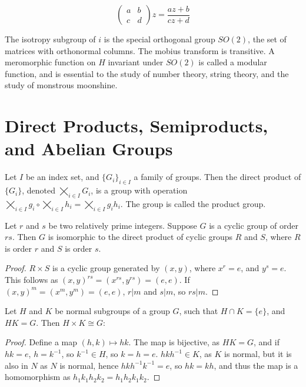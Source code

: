 \documentclass[12pt]{report}
\begin{document}
\[\begin{pmatrix} a & b \\ c & d \end{pmatrix} z = \frac{az + b}{cz + d}\]

The isotropy subgroup of $i$ is the special orthogonal group $SO(2)$, the set of matrices with orthonormal columns. The mobius transform is transitive. A meromorphic function on $H$ invariant under $SO(2)$ is called a modular function, and is essential to the study of number theory, string theory, and the study of monstrous moonshine.

\chapter{Direct Products, Semiproducts, and Abelian Groups}

Let $I$ be an index set, and $\{ G_i \}_{i \in I}$ a family of groups. Then the direct product of $\{ G_i \}$, denoted $\bigtimes_{i \in I} G_i$, is a group with operation $\bigtimes_{i \in I} g_i \circ \bigtimes_{i \in I} h_i = \bigtimes_{i \in I} g_ih_i$. The group is called the product group.

Let $r$ and $s$ be two relatively prime integers. Suppose $G$ is a cyclic group of order $rs$. Then $G$ is isomorphic to the direct product of cyclic groups $R$ and $S$, where $R$ is order $r$ and $S$ is order $s$.
\begin{proof}
    $R \times S$ is a cyclic group generated by $(x,y)$, where $x^r = e$, and $y^s = e$. This follows as $(x,y)^{rs} = (x^{rs},y^{rs}) = (e,e)$. If $(x,y)^m = (x^m,y^m) = (e,e)$, $r|m$ and $s|m$, so $rs|m$.
\end{proof}

Let $H$ and $K$ be normal subgroups of a group $G$, such that $H \cap K = \{ e \}$, and $HK = G$. Then $H \times K \cong G$:
\begin{proof}
    Define a map $(h,k) \mapsto hk$. The map is bijective, as $HK = G$, and if $hk = e$, $h = k^{-1}$, so $k^{-1} \in H$, so $k = h = e$. $hkh^{-1} \in K$, as $K$ is normal, but it is also in $N$ as $N$ is normal, hence $hkh^{-1}k^{-1} = e$, so $hk = kh$, and thus the map is a homomorphism as $h_1k_1h_2k_2 = h_1h_2k_1k_2$.
\end{proof}
\end{document}
